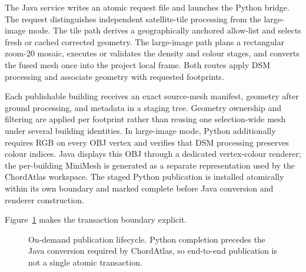 The Java service writes an atomic request file and launches the Python bridge.
The request distinguishes independent satellite-tile processing from the
large-image mode.  The tile path derives a geographically anchored allow-list
and selects fresh or cached corrected geometry.  The large-image path plans a
rectangular zoom-20 mosaic, executes or validates the density and colour
stages, and converts the fused mesh
once into the project local frame.  Both routes apply DSM processing and
associate geometry with requested footprints.

Each publishable building receives an exact source-mesh manifest, geometry
after ground processing, and metadata in a staging tree.  Geometry ownership
and filtering are applied per footprint rather than reusing one
selection-wide mesh under several building identities.  In large-image mode,
Python additionally requires RGB on every OBJ vertex and verifies that DSM
processing preserves colour indices.  Java displays this OBJ through a
dedicated vertex-colour renderer; the per-building MiniMesh is generated as a
separate representation used by the ChordAtlas workspace.  The staged Python
publication is installed atomically within its own boundary and marked
complete before Java conversion and renderer construction.

Figure~\ref{fig:publication-lifecycle} makes the transaction boundary explicit.

\begin{figure}[H]
\centering
{}
\caption{On-demand publication lifecycle.  Python completion precedes
the Java conversion required by ChordAtlas, so end-to-end publication is not a
single atomic transaction.}
\label{fig:publication-lifecycle}
\end{figure}

